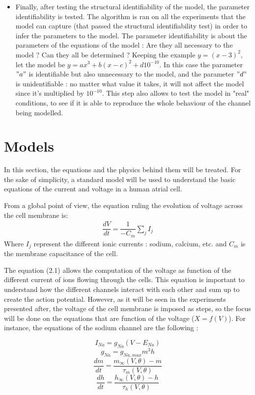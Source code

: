 \documentclass[11pt]{report}
\begin{document}
\begin{itemize}
    \item Finally, after testing the structural identifiability of the model, the parameter identifiability is tested. The algorithm is ran on all the experiments that the model can capture (that passed the structural identifiability test) in order to infer the parameters to the model. The parameter identifiability is about the parameters of the equations of the model : Are they all necessary to the model ? Can they all be determined ? Keeping the example $y = (x-3)^2$, let the model be $y =ax^3 + b(x-c)^2 +d10^{-10} $. In this case the parameter $"a"$ is identifiable but also unnecessary to the model, and the parameter $"d"$ is unidentifiable : no matter what value it takes, it will not affect the model since it's multiplied by $10^{-10}$. This step also allows to test the model in "real" conditions, to see if it is able to reproduce the whole behaviour of the channel being modelled.

    
\end{itemize}



\section{Models}
In this section, the equations and the physics behind them will be treated. For the sake of simplicity, a standard model will be used to understand the basic equations of the current and voltage in a human atrial cell.

From a global point of view, the equation ruling the evolution of voltage across the cell membrane is:
\begin{eqnarray}
\dfrac{dV}{dt} = \dfrac{1}{-C_{m}} \sum_{j} I_{j}
\end{eqnarray}
Where $I_{j}$ represent the different ionic currents : sodium, calcium, etc. and $C_{m}$ is the membrane capacitance of the cell.

The equation (2.1) allows the computation of the voltage as function of the different current of ions flowing through the cells. This equation is important to understand how the different channels interact with each other and sum up to create the action potential. However, as it will be seen in the experiments presented after, the voltage of the cell membrane is imposed as steps, so the focus will be done on the equations that are function of the voltage ($X= f(V)$). For instance, the equations of the sodium channel are the following :

$$I_{Na} = g_{Na}(V-E_{Na})$$
$$g_{Na} = g_{Na,max}m^{3}h $$
$$\dfrac{dm}{dt} = \dfrac{m_{\infty}(V,\theta) - m}{\tau_{m}(V,\theta)}$$
$$\dfrac{dh}{dt} = \dfrac{h_{\infty}(V,\theta) - h}{\tau_{h}(V,\theta)}$$
\end{document}
